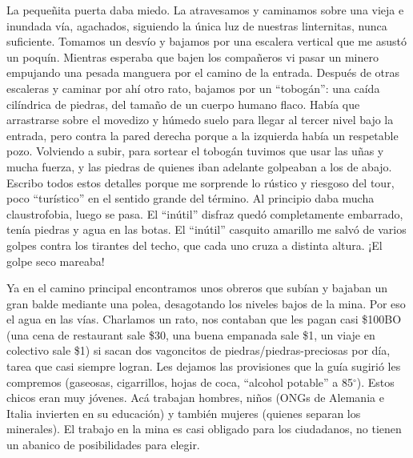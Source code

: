 La pequeñita puerta daba miedo. La atravesamos y caminamos sobre una vieja e
inundada vía, agachados, siguiendo la única luz de nuestras linternitas, nunca
suficiente. Tomamos un desvío y bajamos por una escalera vertical que me
asustó un poquín. Mientras esperaba que bajen los compañeros vi pasar un
minero empujando una pesada manguera por el camino de la entrada. Después de
otras escaleras y caminar por ahí otro rato, bajamos por un ``tobogán'': una
caída cilíndrica de piedras, del tamaño de un cuerpo humano flaco. Había
que arrastrarse sobre el movedizo y húmedo suelo para llegar al tercer nivel
bajo la entrada, pero contra la pared derecha porque a la izquierda había un
respetable pozo. Volviendo a subir, para sortear el tobogán tuvimos que usar
las uñas y mucha fuerza, y las piedras de quienes iban adelante golpeaban a
los de abajo. Escribo todos estos detalles porque me sorprende lo rústico y
riesgoso del tour, poco ``turístico'' en el sentido grande del término. Al
principio daba mucha claustrofobia, luego se pasa. El ``inútil'' disfraz quedó
completamente embarrado, tenía piedras y agua en las botas. El ``inútil''
casquito amarillo me salvó de varios golpes contra los tirantes del techo, que
cada uno cruza a distinta altura. ¡El golpe seco mareaba!

Ya en el camino principal encontramos unos obreros que subían y bajaban un gran
balde mediante una polea, desagotando los niveles bajos de la mina. Por eso el
agua en las vías. Charlamos un rato, nos contaban que les pagan casi
\$100{\small BO} (una cena de restaurant sale \$30, una buena empanada
sale \$1, un viaje en colectivo sale \$1) si sacan dos vagoncitos de
piedras/piedras-preciosas por día, tarea que casi siempre logran. Les dejamos
las provisiones que la guía sugirió les compremos (gaseosas, cigarrillos,
hojas de coca, ``alcohol potable'' a 85$^\circ$). Estos chicos eran muy
jóvenes. Acá trabajan hombres, niños ({\small ONG}s de Alemania e
Italia invierten en su educación) y también mujeres (quienes separan los
minerales). El trabajo en la mina es casi obligado para los ciudadanos, no
tienen un abanico de posibilidades para elegir.\\

